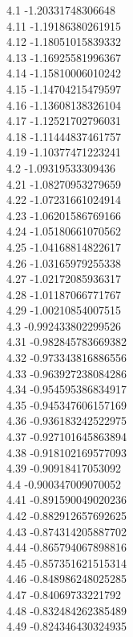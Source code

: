 {4.1	-1.20331748306648\\
4.11	-1.19186380261915\\
4.12	-1.18051015839332\\
4.13	-1.16925581996367\\
4.14	-1.15810006010242\\
4.15	-1.14704215479597\\
4.16	-1.13608138326104\\
4.17	-1.12521702796031\\
4.18	-1.11444837461757\\
4.19	-1.10377471223241\\
4.2	-1.09319533309436\\
4.21	-1.08270953279659\\
4.22	-1.07231661024914\\
4.23	-1.06201586769166\\
4.24	-1.05180661070562\\
4.25	-1.04168814822617\\
4.26	-1.03165979255338\\
4.27	-1.02172085936317\\
4.28	-1.01187066771767\\
4.29	-1.00210854007515\\
4.3	-0.992433802299526\\
4.31	-0.982845783669382\\
4.32	-0.973343816886556\\
4.33	-0.963927238084286\\
4.34	-0.954595386834917\\
4.35	-0.945347606157169\\
4.36	-0.936183242522975\\
4.37	-0.927101645863894\\
4.38	-0.918102169577093\\
4.39	-0.90918417053092\\
4.4	-0.900347009070052\\
4.41	-0.891590049020236\\
4.42	-0.882912657692625\\
4.43	-0.874314205887702\\
4.44	-0.865794067898816\\
4.45	-0.857351621515314\\
4.46	-0.848986248025285\\
4.47	-0.84069733221792\\
4.48	-0.832484262385489\\
4.49	-0.824346430324935\\
}
